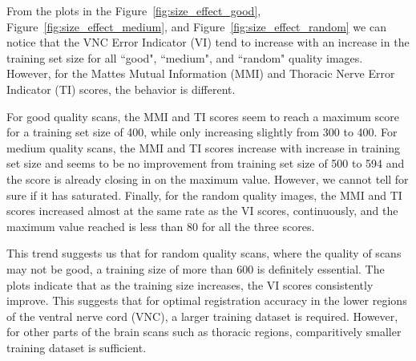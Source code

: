 \documentclass{book}
\begin{document}
	From the plots in the Figure~\ref{fig:size_effect_good}, Figure~\ref{fig:size_effect_medium}, and Figure~\ref{fig:size_effect_random} we can notice that the VNC Error Indicator (VI) tend to increase with an increase in the training set size for all ``good", ``medium", and ``random" quality images. However, for the Mattes Mutual Information (MMI) and Thoracic Nerve Error Indicator (TI) scores, the behavior is different.
	
	For good quality scans, the MMI and TI scores seem to reach a maximum score for a training set size of 400, while only increasing slightly from 300 to 400. For medium quality scans, the MMI and TI scores increase with increase in training set size and seems to be no improvement from training set size of 500 to 594 and the score is already closing in on the maximum value. However, we cannot tell for sure if it has saturated. Finally, for the random quality images, the MMI and TI scores increased almost at the same rate as the VI scores, continuously, and the maximum value reached is less than 80 for all the three scores.
	
	This trend suggests us that for random quality scans, where the quality of scans may not be good, a training size of more than 600 is definitely essential. The plots indicate that as the training size increases, the VI scores consistently improve. This suggests that for optimal registration accuracy in the lower regions of the ventral nerve cord (VNC), a larger training dataset is required. However, for other parts of the brain scans such as thoracic regions, comparitively smaller training dataset is sufficient.
	
\end{document}
